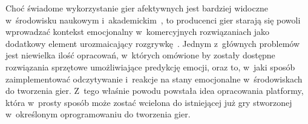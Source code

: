 Choć świadome wykorzystanie gier afektywnych jest bardziej widoczne w~środowisku naukowym i~akademickim~\cite{affective_design_patterns_2017,prototypes_affective_games_2019}, to producenci gier starają się powoli wprowadzać kontekst emocjonalny w~komercyjnych rozwiązaniach jako dodatkowy element urozmaicający rozgrywkę~\cite{nevermind_gamesradar,bring_to_light_steam}. Jednym z~głównych problemów jest niewielka ilość opracowań, w~których omówione by zostały dostępne rozwiązania sprzętowe umożliwiające predykcję emocji, oraz to, w~jaki sposób zaimplementować odczytywanie i~reakcje na stany emocjonalne w~środowiskach do tworzenia gier. Z~tego właśnie powodu powstała idea opracowania platformy, która w~prosty sposób może zostać wcielona do istniejącej już gry stworzonej w~określonym oprogramowaniu do tworzenia gier.